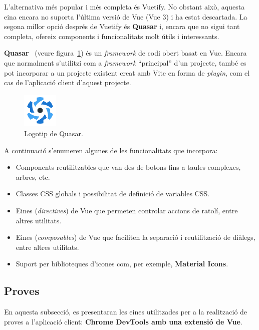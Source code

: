 \documentclass[a4paper,12pt]{ThesisStyle}
\begin{document}
L'alternativa més popular i més completa és Vuetify. No obstant això, aquesta eina encara no suporta l'última versió de Vue (Vue 3) i ha estat descartada. La segona millor opció després de Vuetify és \textbf{Quasar} i, encara que no sigui tant completa, ofereix components i funcionalitats molt útils i interessants.

\textbf{Quasar}~\cite{Quasar} (veure figura~\ref{img:logo_quasar}) és un \textit{framework} de codi obert basat en Vue. Encara que normalment s'utilitzi com a \textit{framework} ``principal'' d'un projecte, també es pot incorporar a un projecte existent creat amb Vite en forma de \textit{plugin}, com el cas de l'aplicació client d'aquest projecte.

\begin{figure}[H]
  \centering
  \includegraphics[width=0.15\textwidth]{assets/logos/Quasar.png}
  \caption{\label{img:logo_quasar}Logotip de Quasar.}
\end{figure}

A continuació s'enumeren algunes de les funcionalitats que incorpora:
\begin{itemize}
  \item Components reutilitzables que van des de botons fins a taules complexes, arbres, etc.
  \item Classes CSS globals i possibilitat de definició de variables CSS.
  \item Eines (\textit{directives}) de Vue que permeten controlar accions de ratolí, entre altres utilitats.
  \item Eines (\textit{composables}) de Vue que faciliten la separació i reutilització de diàlegs, entre altres utilitats.
  \item Suport per biblioteques d'icones com, per exemple, \textbf{Material Icons}.
\end{itemize}

\subsection{Proves}
\label{subsec:decisions_client_proves}

En aquesta subsecció, es presentaran les eines utilitzades per a la realització de proves a l'aplicació client: \textbf{Chrome DevTools amb una extensió de Vue}.
\end{document}
